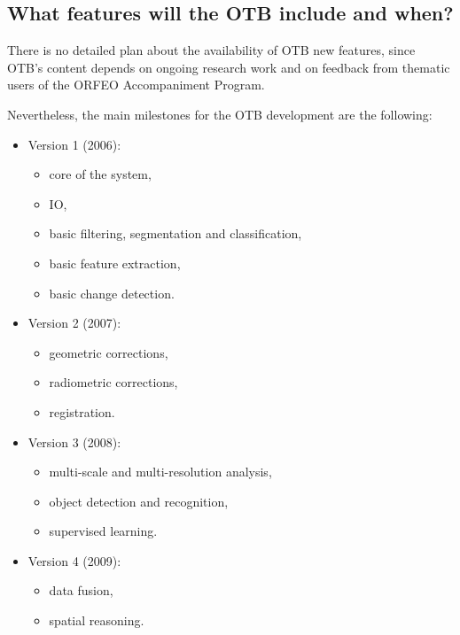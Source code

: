 \subsection{What features will the OTB include and when?}
There is no detailed plan about the availability of OTB new features,
since OTB's content depends on ongoing research work and on feedback
from thematic users of the ORFEO Accompaniment Program.

Nevertheless, the main milestones for the OTB development are the
following:
\begin{itemize}
  \item{Version 1 (2006):}
    \begin{itemize}
    \item core of the system,
    \item IO,
    \item basic filtering, segmentation and classification,
    \item basic feature extraction,
    \item basic change detection.
    \end{itemize}
    \item{Version 2 (2007):}
      \begin{itemize}
      \item geometric corrections,
      \item radiometric corrections,
      \item registration.
      \end{itemize}
    \item{Version 3 (2008):}
      \begin{itemize}
      \item multi-scale and multi-resolution analysis,
      \item object detection and recognition,
      \item supervised learning.
      \end{itemize}
    \item{Version 4 (2009):}
      \begin{itemize}
	\item data fusion,
	\item spatial reasoning.
      \end{itemize}
    
\end{itemize}

